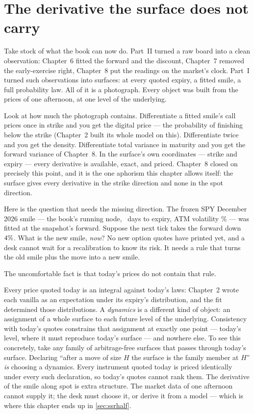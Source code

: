 \section{The derivative the surface does not carry}
\label{sec:ssrmissing}

Take stock of what the book can now do.  Part~II turned a raw board
into a clean observation: Chapter~6 fitted the forward and the
discount, Chapter~7 removed the early-exercise right, Chapter~8 put
the readings on the market's clock.  Part~I turned such observations into
surfaces: at every quoted expiry, a fitted smile, a full probability
law.  All of it is a photograph.  Every object was built from the
prices of one afternoon, at one level of the underlying.

Look at how much the photograph contains.  Differentiate a fitted
smile's call prices once in strike and you get the digital price ---
the probability of finishing below the strike (Chapter~2 built its
whole model on this).  Differentiate twice and you get the density.
Differentiate total variance in maturity and you get the forward
variance of Chapter~8.  In the surface's own coordinates --- strike
and expiry --- every derivative is available, exact, and priced.
Chapter~8 closed on precisely this point, and it is the one aphorism
this chapter allows itself: the surface gives every derivative in the
strike direction and none in the spot direction.

Here is the question that needs the missing direction.  The frozen SPY
December 2026 smile --- the book's running node, \MacSsrHeroDays\ days
to expiry, ATM volatility \MacSsrHeroAtmPct\% --- was fitted at the
snapshot's forward.  Suppose the next tick takes the forward down
$4\%$.  What is the new smile, \emph{now}?  No new
option quotes have printed yet, and a desk cannot wait for a
recalibration to know its risk.  It needs a rule that turns the old
smile plus the move into a new smile.

The uncomfortable fact is that today's prices do not contain that
rule.

\begin{remark}
\label{rem:ssrident}
Every price quoted today is an integral against today's laws: Chapter~2
wrote each vanilla as an expectation under its expiry's distribution,
and the fit determined those distributions.  A \emph{dynamics} is a
different kind of object: an assignment of a whole surface to each
future level of the underlying.  Consistency with today's quotes
constrains that assignment at exactly one point --- today's level,
where it must reproduce today's surface --- and nowhere else.  To see
this concretely, take any family of arbitrage-free surfaces that
passes through today's surface.  Declaring ``after a move of size $H$
the surface is the family member at $H$'' \emph{is} choosing a
dynamics.  Every instrument quoted today is priced identically under
every such declaration, so today's quotes cannot rank them.  The
derivative of the smile along spot is extra structure.  The market data of one afternoon cannot supply
it; the desk must choose it, or derive it from a model --- which is
where this chapter ends up in \cref{sec:ssrhalf}.
\end{remark}


